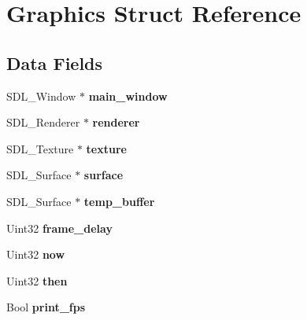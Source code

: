 \hypertarget{struct_graphics}{}\section{Graphics Struct Reference}
\label{struct_graphics}
\subsection*{Data Fields}
\begin{DoxyCompactItemize}
\item 
\mbox{\label{struct_graphics_a6d874aedde3f9bbb27b10879f2136510}} 
S\+D\+L\+\_\+\+Window $\ast$ {\bfseries main\+\_\+window}
\item 
\mbox{\label{struct_graphics_a966da7a60c4ea3ba301e26ccc5efe452}} 
S\+D\+L\+\_\+\+Renderer $\ast$ {\bfseries renderer}
\item 
\mbox{\label{struct_graphics_a859b8efbf9abe8e82757ee5c75a0c97c}} 
S\+D\+L\+\_\+\+Texture $\ast$ {\bfseries texture}
\item 
\mbox{\label{struct_graphics_a2f5cac12e913bcfcff660305bf88dd3b}} 
S\+D\+L\+\_\+\+Surface $\ast$ {\bfseries surface}
\item 
\mbox{\label{struct_graphics_a7dbe1c1c02721b94a0a20771dfc2ace6}} 
S\+D\+L\+\_\+\+Surface $\ast$ {\bfseries temp\+\_\+buffer}
\item 
\mbox{\label{struct_graphics_a8d6bd7c397df4eeb9b742e687e170f38}} 
Uint32 {\bfseries frame\+\_\+delay}
\item 
\mbox{\label{struct_graphics_acd416cb12b6be767816f4b132e0139f2}} 
Uint32 {\bfseries now}
\item 
\mbox{\label{struct_graphics_a44ae6bd6838debc09ab2e58b992b9e3b}} 
Uint32 {\bfseries then}
\item 
\mbox{\label{struct_graphics_a56879b567818df346c0bd9c72258e39b}} 
Bool {\bfseries print\+\_\+fps}
\item 
\mbox{\label{struct_graphics_a4f50e96f11c68d45dc109185efe011ad}} 

\end{DoxyCompactItemize}
